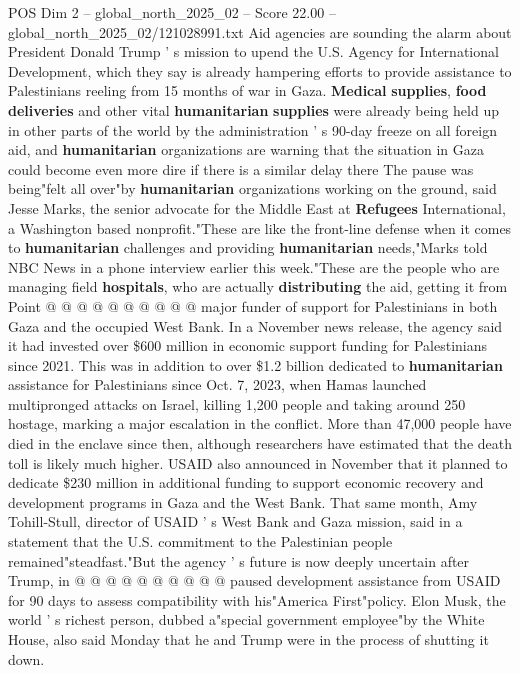 \begin{textsample}{POS Dim 2 – global\_north\_2025\_02 – Score 22.00 – global\_north\_2025\_02/121028991.txt}  \label{ex:f2_pos_437}
Aid agencies are sounding the alarm about President Donald Trump ' s mission to upend the U.S.
Agency for International Development, which they say is already hampering efforts to provide assistance to Palestinians reeling from 15 months of war in Gaza. \textbf{Medical} \textbf{supplies}, \textbf{food} \textbf{deliveries} and other vital \textbf{humanitarian} \textbf{supplies} were already being held up in other parts of the world by the administration ' s 90-day freeze on all foreign aid, and \textbf{humanitarian} organizations are warning that the situation in Gaza could become even more dire if there is a similar delay there The pause was being"felt all over"by \textbf{humanitarian} organizations working on the ground, said Jesse Marks, the senior advocate for the Middle East at \textbf{Refugees} International, a Washington based nonprofit."These are like the front-line defense when it comes to \textbf{humanitarian} challenges and providing \textbf{humanitarian} needs,"Marks told NBC News in a phone interview earlier this week."These are the people who are managing field \textbf{hospitals}, who are actually \textbf{distributing} the aid, getting it from Point @ @ @ @ @ @ @ @ @ @ major funder of support for Palestinians in both Gaza and the occupied West Bank.
In a November news release, the agency said it had invested over \$600 million in economic support funding for Palestinians since 2021.
This was in addition to over \$1.2 billion dedicated to \textbf{humanitarian} assistance for Palestinians since Oct. 7, 2023, when Hamas launched multipronged attacks on Israel, killing 1,200 people and taking around 250 hostage, marking a major escalation in the conflict.
More than 47,000 people have died in the enclave since then, although researchers have estimated that the death toll is likely much higher.
USAID also announced in November that it planned to dedicate \$230 million in additional funding to support economic recovery and development programs in Gaza and the West Bank.
That same month, Amy Tohill-Stull, director of USAID ' s West Bank and Gaza mission, said in a statement that the U.S. commitment to the Palestinian people remained"steadfast."But the agency ' s future is now deeply uncertain after Trump, in @ @ @ @ @ @ @ @ @ @ paused development assistance from USAID for 90 days to assess compatibility with his"America First"policy.
Elon Musk, the world ' s richest person, dubbed a"special government employee"by the White House, also said Monday that he and Trump were in the process of shutting it down.

\end{textsample}
